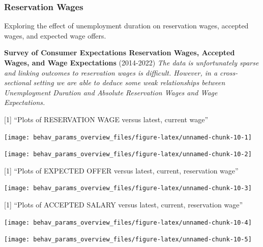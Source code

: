 \documentclass[
]{article}
\begin{document}
\subsubsection{Reservation Wages}\label{reservation-wages}

Exploring the effect of unemployment duration on reservation wages,
accepted wages, and expected wage offers.

\textbf{Survey of Consumer Expectations Reservation Wages, Accepted
Wages, and Wage Expectations} (2014-2022) \emph{The data is
unfortunately sparse and linking outcomes to reservation wages is
difficult. However, in a cross-sectional setting we are able to deduce
some weak relationships between Unemployment Duration and Absolute
Reservation Wages and Wage Expectations.}

{[}1{]} ``Plots of RESERVATION WAGE versus latest, current wage''

\begin{center}\texttt{[image: behav\_params\_overview\_files/figure-latex/unnamed-chunk-10-1]} \end{center}

\begin{center}\texttt{[image: behav\_params\_overview\_files/figure-latex/unnamed-chunk-10-2]} \end{center}

{[}1{]} ``Plots of EXPECTED OFFER versus latest, current, reservation
wage''

\begin{center}\texttt{[image: behav\_params\_overview\_files/figure-latex/unnamed-chunk-10-3]} \end{center}

{[}1{]} ``Plots of ACCEPTED SALARY versus latest, current, reservation
wage''

\begin{center}\texttt{[image: behav\_params\_overview\_files/figure-latex/unnamed-chunk-10-4]} \end{center}

\begin{center}\texttt{[image: behav\_params\_overview\_files/figure-latex/unnamed-chunk-10-5]} \end{center}
\end{document}
